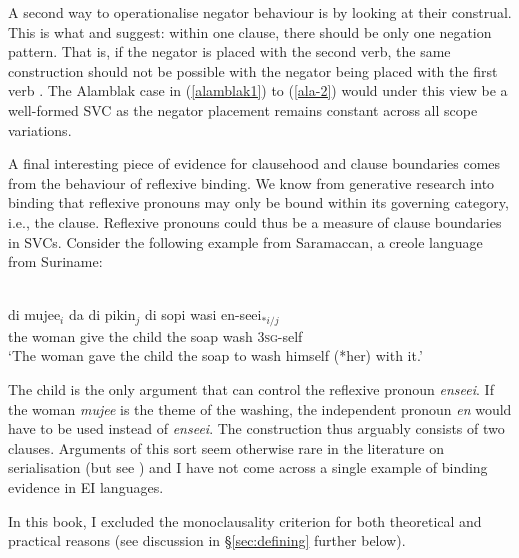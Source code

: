 A second way to operationalise negator behaviour is by looking at their construal. This is what \citet{haspelmath2016serial} and  \citet{bohnemeyer2007principles} suggest: within one clause, there should be only one negation pattern. That is, if the negator is placed with the second verb, the same construction should not be possible with the negator being placed with the first verb \citep{haspelmath2016serial}. The Alamblak case in (\ref{alamblak1}) to (\ref{ala-2}) would under this view be a well-formed SVC as the negator placement remains constant across all scope variations.

A final interesting piece of evidence for clausehood and clause boundaries comes from the behaviour of reflexive binding. We know from generative research into binding that reflexive pronouns may only be bound within its governing category, i.e., the clause. Reflexive pronouns could thus be a measure of clause boundaries in SVCs. Consider the following example from Saramaccan, a creole language from Suriname:

\ea \label{}
\\
\gll di mujee$_i$ da di pikin$_j$ di sopi wasi en-seei$_{*i/j}$ \\
the woman give the child the soap wash \textsc{3}\textsc{sg}-self \\
\glft `The woman gave the child the soap to wash himself (*her) with it.'\\ 
\z

The child is the only argument that can control the reflexive pronoun \textit{enseei}. If the woman \textit{mujee} is the theme of the washing, the independent pronoun \textit{en} would have to be used instead of \textit{enseei}. The construction thus arguably consists of two clauses. Arguments of this sort seem otherwise rare in the literature on serialisation (but see \citealt[514]{baker1989object}) and I have not come across a single example of binding evidence in EI languages. 

In this book, I excluded the monoclausality criterion for both theoretical and practical reasons (see discussion in §\ref{sec:defining} further below).

